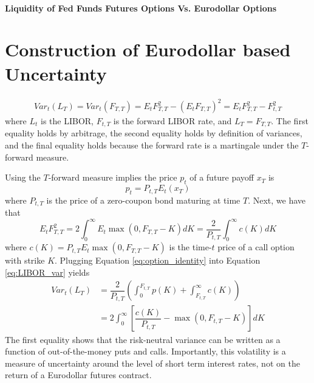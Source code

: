 \documentclass[11pt]{article}
\begin{document}
\paragraph{Liquidity of Fed Funds Futures Options Vs. Eurodollar Options}


\section{Construction of Eurodollar based Uncertainty}\label{previous work}
\begin{equation}
\begin{split}
Var_{t}(L_{T}) = Var_{t}(F_{T, T})= E_{t}F_{T, T}^{2}-(E_{t}F_{T, T})^{2}=E_{t}F_{T, T}^{2} - F_{t, T}^{2}
\end{split}
\label{eq:LIBOR_var}
\end{equation}
where $L_{t}$ is the LIBOR, $F_{t, T}$ is the forward LIBOR rate, and $L_{T} = F_{T, T}$. The first equality holds by arbitrage, the second equality holds by definition of variances, and the final equality holds because the forward rate is a martingale under the $T$-forward measure. 

Using the $T$-forward measure implies the price $p_{t}$ of a future payoff $x_{T}$ is 
\begin{equation*}
	p_{t} = P_{t, T}E_{t}(x_{T})
\end{equation*}
where $P_{t, T}$ is the price of a zero-coupon bond maturing at time $T$. Next, we have that 
\begin{equation}
E_{t}F_{T, T}^{2} = 2 \int_{0}^{\infty}E_{t}\max(0, F_{T, T}-K)dK = \dfrac{2}{P_{t, T}}\int_{0}^{\infty} c(K)dK
\label{eq:option_identity}
\end{equation}
where $c(K) = P_{t, T}E_{t}\max(0, F_{T, T}-K)$ is the time-$t$ price of a call option with strike $K$. 
Plugging Equation \ref{eq:option_identity} into Equation \ref{eq:LIBOR_var} yields 
\begin{equation}
\begin{split}
Var_{t}(L_{T}) &= \dfrac{2}{P_{t, T}}\left(\int_{0}^{F_{t, T}}p(K) + \int_{F_{t, T}}^{\infty}c(K)\right)\\
&=2 \int_{0}^{\infty}\left[\dfrac{c(K)}{P_{t, T}}- \max(0, F_{t, T}-K)\right]dK
\end{split}
\label{eq:oom_expression}
\end{equation}
The first equality shows that the risk-neutral variance can be written as a function of out-of-the-money puts and calls. Importantly, this volatility is a measure of uncertainty around the level of short term interest rates, not on the return of a Eurodollar futures contract.\\
\end{document}
